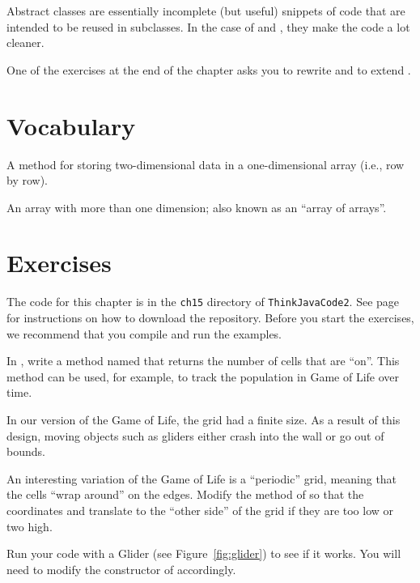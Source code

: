 Abstract classes are essentially incomplete (but useful) snippets of code that are intended to be reused in subclasses.
In the case of  and , they make the code a lot cleaner.

One of the exercises at the end of the chapter asks you to rewrite  and  to extend .


\section{Vocabulary}

\begin{description}

A method for storing two-dimensional data in a one-dimensional array (i.e., row by row).

An array with more than one dimension; also known as an ``array of arrays''.


\end{description}


\section{Exercises}

The code for this chapter is in the {\tt ch15} directory of {\tt ThinkJavaCode2}.
See page~\pageref{code} for instructions on how to download the repository.
Before you start the exercises, we recommend that you compile and run the examples.


\begin{exercise}
In , write a method named  that returns the number of cells that are ``on''.
This method can be used, for example, to track the population in Game of Life over time.
\end{exercise}


\begin{exercise}
In our version of the Game of Life, the grid had a finite size.
As a result of this design, moving objects such as gliders either crash into the wall or go out of bounds.

An interesting variation of the Game of Life is a ``periodic'' grid, meaning that the cells ``wrap around'' on the edges.
Modify the  method of  so that the coordinates  and  translate to the ``other side'' of the grid if they are too low or two high.

Run your code with a Glider (see Figure~\ref{fig:glider}) to see if it works.
You will need to modify the constructor of  accordingly.
\end{exercise}


